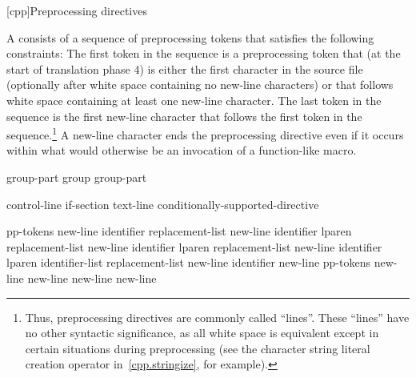 [cpp]{Preprocessing directives}%

%
%


\pnum
A  consists of a sequence of preprocessing tokens
that satisfies the following constraints:
The first token in the sequence is a
\tcode{\#}
preprocessing token that (at the start of translation phase 4)
is either the first character in the source file
(optionally after white space containing no new-line characters)
or that follows white space containing at least one new-line character.
The last token in the sequence is the first new-line character
that follows the first token in the sequence.\footnote{Thus,
preprocessing directives are commonly called ``lines''.
These ``lines'' have no other syntactic significance,
as all white space is equivalent except in certain situations
during preprocessing (see the
\tcode{\#}
character string literal creation operator in~\ref{cpp.stringize}, for example).}
A new-line character ends the preprocessing directive even if it occurs
within what would otherwise be an invocation of a function-like macro.

\begin{bnf}
\br
\end{bnf}

\begin{bnf}
\br
    group-part\br
    group group-part
\end{bnf}

\begin{bnf}
\br
    control-line\br
    if-section\br
    text-line\br
    \terminal{\#} conditionally-supported-directive
\end{bnf}

\begin{bnftab}
\br
\>\>\>pp-tokens new-line\br
\>\>\>identifier replacement-list new-line\br
\>\>\>identifier lparen  \terminal{)} replacement-list new-line\br
\>\>\>identifier lparen  replacement-list new-line\br
\>\>\>identifier lparen identifier-list  replacement-list new-line\br
\>\>\>identifier new-line\br
\>\>\>pp-tokens new-line\br
\>\>\> new-line\br
\>\>\> new-line\br
\>\terminal{\# }new-line
\end{bnftab}

